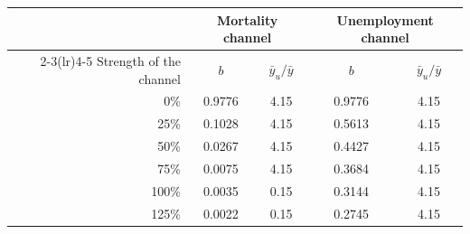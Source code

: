 \begin{tabular}{@{}rcccc@{}}
\toprule
& \multicolumn{2}{c}{Mortality channel} & \multicolumn{2}{c}{Unemployment channel} \\
\cmidrule(lr){2-3}\cmidrule(lr){4-5}
Strength of the channel & $b$ & $\bar y_u/\bar y$ & $b$ & $\bar y_u/\bar y$ \\
\midrule
0\% & 0.9776 & 4.15 & 0.9776 & 4.15 \\
25\% & 0.1028 & 4.15 & 0.5613 & 4.15 \\
50\% & 0.0267 & 4.15 & 0.4427 & 4.15 \\
75\% & 0.0075 & 4.15 & 0.3684 & 4.15 \\
100\% & 0.0035 & 0.15 & 0.3144 & 4.15 \\
125\% & 0.0022 & 0.15 & 0.2745 & 4.15 \\
\bottomrule
\end{tabular}
